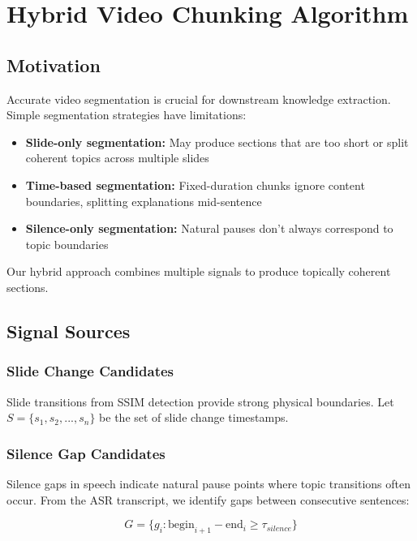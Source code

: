 \section{Hybrid Video Chunking Algorithm}
\label{sec:chunking}

\subsection{Motivation}

Accurate video segmentation is crucial for downstream knowledge extraction. Simple segmentation strategies have limitations:

\begin{itemize}
    \item \textbf{Slide-only segmentation:} May produce sections that are too short or split coherent topics across multiple slides
    \item \textbf{Time-based segmentation:} Fixed-duration chunks ignore content boundaries, splitting explanations mid-sentence
    \item \textbf{Silence-only segmentation:} Natural pauses don't always correspond to topic boundaries
\end{itemize}

Our hybrid approach combines multiple signals to produce topically coherent sections.

\subsection{Signal Sources}

\subsubsection{Slide Change Candidates}

Slide transitions from SSIM detection provide strong physical boundaries. Let $S = \{s_1, s_2, ..., s_n\}$ be the set of slide change timestamps.

\subsubsection{Silence Gap Candidates}

Silence gaps in speech indicate natural pause points where topic transitions often occur. From the ASR transcript, we identify gaps between consecutive sentences:

\begin{equation}
    G = \{g_i : \text{begin}_{i+1} - \text{end}_i \geq \tau_{silence}\}
\end{equation}


